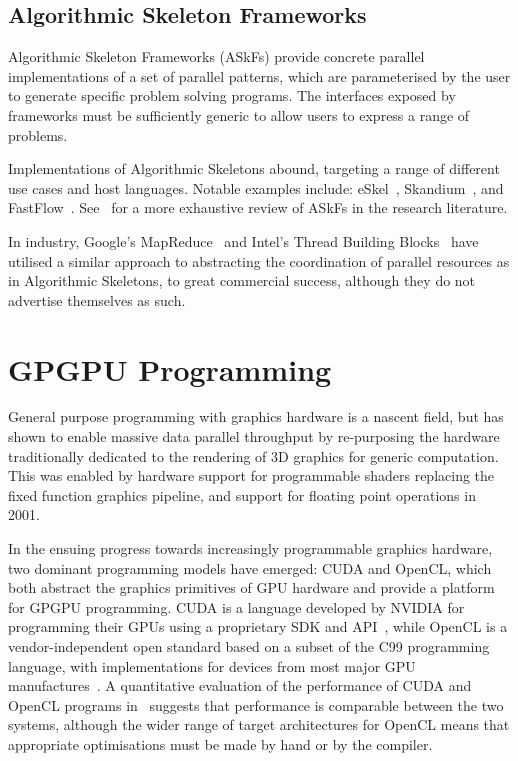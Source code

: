 \subsection{Algorithmic Skeleton Frameworks}

Algorithmic Skeleton Frameworks (ASkFs) provide concrete parallel
implementations of a set of parallel patterns, which are parameterised
by the user to generate specific problem solving programs. The
interfaces exposed by frameworks must be sufficiently generic to allow
users to express a range of problems.

Implementations of Algorithmic Skeletons abound, targeting a range of
different use cases and host languages. Notable examples include:
eSkel~\cite{Benoit2005a}, Skandium~\cite{Leyton2010}, and
FastFlow~\cite{Aldinucci2011}. See~\cite{Gonzalez2010} for a more
exhaustive review of ASkFs in the research literature.

In industry, Google's MapReduce~\cite{Dean2008} and Intel's Thread
Building Blocks~\cite{IntelTBB} have utilised a similar approach to
abstracting the coordination of parallel resources as in Algorithmic
Skeletons, to great commercial success, although they do not advertise
themselves as such.



\section{GPGPU Programming}

General purpose programming with graphics hardware is a nascent field,
but has shown to enable massive data parallel throughput by
re-purposing the hardware traditionally dedicated to the rendering of
3D graphics for generic computation. This was enabled by hardware
support for programmable shaders replacing the fixed function graphics
pipeline, and support for floating point operations in 2001.

In the ensuing progress towards increasingly programmable graphics
hardware, two dominant programming models have emerged: CUDA and
OpenCL, which both abstract the graphics primitives of GPU hardware
and provide a platform for GPGPU programming. CUDA is a language
developed by NVIDIA for programming their GPUs using a proprietary SDK
and API~\cite{Nvidia2007}, while OpenCL is a vendor-independent open
standard based on a subset of the C99 programming language, with
implementations for devices from most major GPU
manufactures~\cite{Stone2010}. A quantitative evaluation of the
performance of CUDA and OpenCL programs in~\cite{Komatsu2010} suggests
that performance is comparable between the two systems, although the
wider range of target architectures for OpenCL means that appropriate
optimisations must be made by hand or by the compiler.


